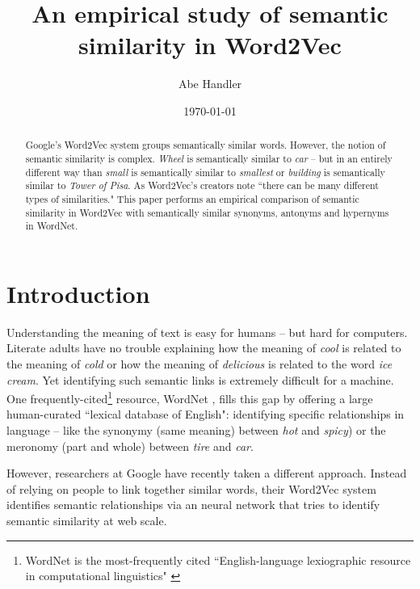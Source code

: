 \documentclass{article}
\title{An empirical study of semantic similarity in Word2Vec}
\author{Abe Handler}
\date{\today}
\begin{document}
\begin{abstract}
Google's Word2Vec system groups semantically similar words. However, the notion of semantic similarity is complex. \textit{Wheel} is semantically similar to \textit{car} -- but in an entirely different way than \textit{small} is semantically similar to \textit{smallest} or \textit{building} is semantically similar to \textit{Tower of Pisa}. As Word2Vec's creators  note ``there can be many different types of similarities." This paper performs an empirical comparison of semantic similarity in Word2Vec with semantically similar synonyms, antonyms and hypernyms in WordNet.
\end{abstract}

\maketitle

\section{Introduction}


Understanding the meaning of text is easy for humans -- but hard for computers. Literate adults have no trouble explaining how the meaning of \textit{cool} is related to the meaning of \textit{cold} or how the meaning of \textit{delicious} is related to the word \textit{ice cream}. Yet identifying such semantic links is extremely difficult for a machine. One frequently-cited\footnote{WordNet is the most-frequently cited ``English-language lexiographic resource in computational linguistics" \cite{widdows}} resource, WordNet \cite{wordnet}, fills this gap by offering a large human-curated ``lexical database of English": identifying specific relationships in language -- like the synonymy (same meaning) between \textit{hot} and \textit{spicy}) or the meronomy (part and whole) between \textit{tire} and \textit{car}.

However, researchers at Google have recently taken a different approach. Instead of relying on people to link together similar words, their Word2Vec system identifies semantic relationships via an neural network that tries to identify semantic similarity at web scale.\cite{Word2Vec}
\end{document}
